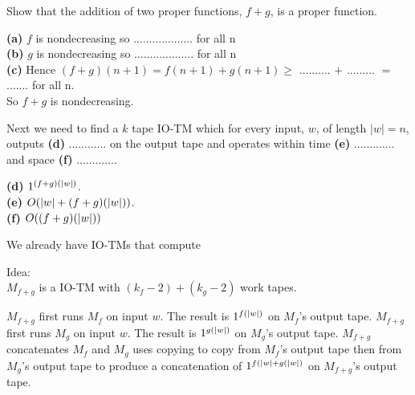 \frmrule

\begin{example}
Show that the addition of two proper functions, $f + g$, is a proper function.

\textbf{(a)} $f$ is nondecreasing so ................... for all n \\
\textbf{(b)} $g$ is nondecreasing so ................... for all n \\
\textbf{(c)} Hence $(f + g)(n+1) = f(n+1) + g(n+1) \geqslant$ .......... $+$ ......... $ = $ ....... for all n. \\
So $f + g$ is nondecreasing. 

Next we need to find a $k$ tape IO-TM which for 
every input, $w$, of length $|w| = n$, outputs \textbf{(d)} ............ 
on the output tape and operates within time \textbf{(e)} ............. 
and space \textbf{(f)} ............. 


\end{example}



{
\textbf{(d)} $1^{(f+g)(\lvert w\rvert)}$. \\
\textbf{(e)} $O(\lvert w\rvert + (f+g)(\lvert w\rvert))$. \\
\textbf{(f)} $O((f+g)(\lvert w\rvert))$ 
}

We already have IO-TMs that compute 


Idea: \\
$M_{f+g}$ is a IO-TM with $(k_f - 2) + (k_g - 2)$ work tapes.

$M_{f+g}$ first runs $M_f$ on input $w$. 
The result is $1^{f(\lvert w\rvert)}$ on $M_f$'s output tape.
$M_{f+g}$ first runs $M_g$ on input $w$. 
The result is $1^{g(\lvert w\rvert)}$ on $M_g$'s output tape.
$M_{f+g}$ concatenates $M_f$ and $M_g$ uses copying
to copy from $M_f$'s output tape then from $M_g$'s output tape
to produce a concatenation of $1^{f(\lvert w\rvert + g(\lvert w\rvert)}$ 
on $M_{f+g}$'s output tape.

